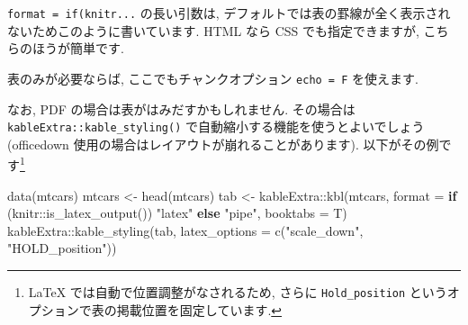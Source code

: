 \documentclass[
]{ltjsarticle}
\newenvironment{Shaded}{\begin{snugshade}}{\end{snugshade}}
\newcommand{\AttributeTok}[1]{\textcolor[rgb]{0.77,0.63,0.00}{#1}}
\newcommand{\ControlFlowTok}[1]{\textcolor[rgb]{0.13,0.29,0.53}{\textbf{#1}}}
\newcommand{\FunctionTok}[1]{\textcolor[rgb]{0.00,0.00,0.00}{#1}}
\newcommand{\NormalTok}[1]{#1}
\newcommand{\OtherTok}[1]{\textcolor[rgb]{0.56,0.35,0.01}{#1}}
\newcommand{\SpecialCharTok}[1]{\textcolor[rgb]{0.00,0.00,0.00}{#1}}
\newcommand{\StringTok}[1]{\textcolor[rgb]{0.31,0.60,0.02}{#1}}
\begin{document}
\texttt{format\ =\ if(knitr...} の長い引数は, デフォルトでは表の罫線が全く表示されないためこのように書いています. HTML なら CSS でも指定できますが, こちらのほうが簡単です.

表のみが必要ならば, ここでもチャンクオプション \texttt{echo\ =\ F} を使えます.

なお, PDF の場合は表がはみだすかもしれません. その場合は \texttt{kableExtra::kable\_styling()} で自動縮小する機能を使うとよいでしょう (officedown 使用の場合はレイアウトが崩れることがあります). 以下がその例です\footnote{LaTeX では自動で位置調整がなされるため, さらに \texttt{Hold\_position} というオプションで表の掲載位置を固定しています.}

\begin{Shaded}
\begin{Highlighting}[numbers=left,,]
\FunctionTok{data}\NormalTok{(mtcars)}
\NormalTok{mtcars }\OtherTok{\textless{}{-}} \FunctionTok{head}\NormalTok{(mtcars)}
\NormalTok{tab }\OtherTok{\textless{}{-}}\NormalTok{ kableExtra}\SpecialCharTok{::}\FunctionTok{kbl}\NormalTok{(mtcars, }\AttributeTok{format =} \ControlFlowTok{if}\NormalTok{ (knitr}\SpecialCharTok{::}\FunctionTok{is\_latex\_output}\NormalTok{()) }\StringTok{"latex"} \ControlFlowTok{else} \StringTok{"pipe"}\NormalTok{, }\AttributeTok{booktabs =}\NormalTok{ T)}
\NormalTok{kableExtra}\SpecialCharTok{::}\FunctionTok{kable\_styling}\NormalTok{(tab, }\AttributeTok{latex\_options =} \FunctionTok{c}\NormalTok{(}\StringTok{"scale\_down"}\NormalTok{, }\StringTok{"HOLD\_position"}\NormalTok{))}
\end{Highlighting}
\end{Shaded}

\begin{table}[H]
\centering
{}
\end{table}
\end{document}

